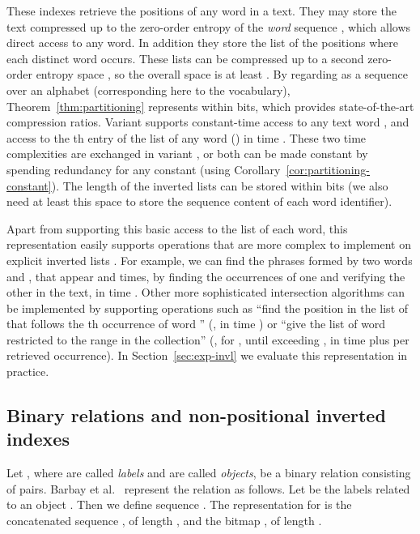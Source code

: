 \documentclass[11pt]{article}
\begin{document}
\begin{table}[t]
{\begin{tabular}
These indexes retrieve the positions of any word in a text. They
may store the text compressed up to the zero-order
entropy of the {\em word} sequence , which allows direct access to
any word. In addition they store the list of the positions where each distinct
word occurs. These lists can be compressed up to a second zero-order entropy
space \cite{NM07}, so the overall space is at least . By regarding
 as a sequence over an alphabet  (corresponding here to the
vocabulary), Theorem~\ref{thm:partitioning} represents  within 
 bits, which provides state-of-the-art
compression ratios. Variant  supports 
constant-time access to any text word , and access to the th 
entry of the list of any word  () in time . 
These two time complexities are exchanged in variant , or both can be 
made constant by spending  redundancy for any constant 
 (using Corollary~\ref{cor:partitioning-constant}). 
The length of the inverted lists can be stored within 
 bits (we also need at least this space to store the sequence 
content of each word identifier).

Apart from supporting this basic access to the list of each word, this
representation easily supports operations that are more complex to implement
on explicit
inverted lists \cite{BLOLS09}. For example, we can find the phrases formed
by two words  and , that appear  and  times, by finding the 
occurrences of one and verifying the other in the text, in time 
. Other more sophisticated intersection algorithms
\cite{BLOLS09} can be implemented by supporting operations such as ``find the
position in the list of  that follows the th occurrence of word ''
(, in time ) or ``give
the list of word  restricted to the range  in the collection''
(, for , until exceeding , in time
 plus  per retrieved occurrence).
In Section~\ref{sec:exp-invl} we evaluate this representation in practice.

\subsection{Binary relations and non-positional inverted indexes}
\label{sec:binrels}

Let , where  are called {\em labels}
and  are called {\em objects}, be a binary relation consisting 
of  pairs. Barbay et al.~\cite{BGMR07} represent the relation as follows. 
Let  be the labels related to an object 
. Then we define sequence . The 
representation for  is the concatenated sequence 
, of length , and 
the bitmap , of length 
.


\end{tabular}}
\end{table}
\end{document}

